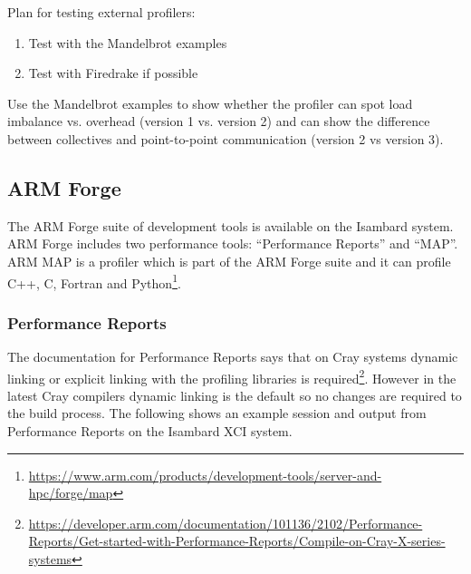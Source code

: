 \documentclass[a4paper,titlepage]{article}
\begin{document}
Plan for testing external profilers:
\begin{enumerate}
\item Test with the Mandelbrot examples
\item Test with Firedrake if possible
\end{enumerate}

Use the Mandelbrot examples to show whether the profiler can spot load imbalance vs. overhead (version 1 vs. version 2) and can show the difference between collectives and point-to-point communication (version 2 vs version 3).


\subsection{ARM Forge}

The ARM Forge suite of development tools is available on the Isambard system. ARM Forge includes two performance tools: ``Performance Reports'' and ``MAP''. 
ARM MAP is a profiler which is part of the ARM Forge suite and it can profile C++, C, Fortran and Python\footnote{\url{https://www.arm.com/products/development-tools/server-and-hpc/forge/map}}.


\subsubsection{Performance Reports}

The documentation for Performance Reports says that on Cray systems dynamic linking or explicit linking with the profiling libraries is required\footnote{\url{https://developer.arm.com/documentation/101136/2102/Performance-Reports/Get-started-with-Performance-Reports/Compile-on-Cray-X-series-systems}}. However in the latest Cray compilers dynamic linking is the default so no changes are required to the build process. The following shows an example session and output from Performance Reports on the Isambard XCI system.
\end{document}
